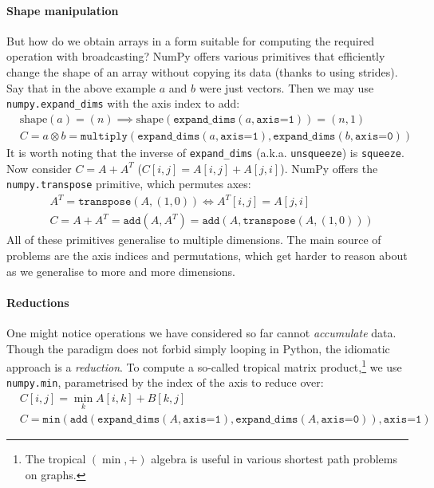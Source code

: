 \paragraph{Shape manipulation} But how do we obtain arrays in a form suitable for computing the required operation with broadcasting? NumPy offers various primitives that efficiently change the shape of an array without copying its data (thanks to using strides). Say that in the above example $a$ and $b$ were just vectors. Then we may use \texttt{numpy.expand\_dims} with the axis index to add:
\begin{align*}
&\mathrm{shape}(a) = (n) \implies \mathrm{shape}(\texttt{expand\_dims}(a, \texttt{axis=1})) = (n, 1) \\
&C = a \otimes b = \texttt{multiply} \left( \texttt{expand\_dims}(a, \texttt{axis=1}), \texttt{expand\_dims}(b, \texttt{axis=0}) \right)
\end{align*}
It is worth noting that the inverse of \texttt{expand\_dims} (a.k.a. \texttt{unsqueeze}) is \texttt{squeeze}. Now consider $C = A + A^T$ ($C[i, j] = A[i, j] + A[j, i]$). NumPy offers the \texttt{numpy.transpose} primitive, which permutes axes:
\begin{align*}
&A^T = \texttt{transpose}(A, (1, 0)) \iff A^T[i, j] = A[j, i] \\
&C = A + A^T = \texttt{add}(A, A^T) = \texttt{add}(A, \texttt{transpose}(A, (1, 0))) 
\end{align*}
All of these primitives generalise to multiple dimensions. 
The main source of problems are the axis indices and permutations, which get harder to reason about as we generalise to more and more dimensions. 

\paragraph{Reductions}

One might notice operations we have considered so far cannot \textit{accumulate} data. Though the paradigm does not forbid simply looping in Python, the idiomatic approach is a \textit{reduction}. To compute a so-called tropical matrix product,\footnote{The tropical $(\min, +)$ algebra is useful in various shortest path problems on graphs.} we use \texttt{numpy.min}, parametrised by the index of the axis to reduce over:
\begin{align*}
&C[i, j] = \min_k A[i, k] + B[k, j] \\
&C = \texttt{min} \left( \texttt{add} \left(\texttt{expand\_dims}(A, \texttt{axis=1}), \texttt{expand\_dims}(A, \texttt{axis=0}) \right), \texttt{axis=1} \right)
\end{align*}

